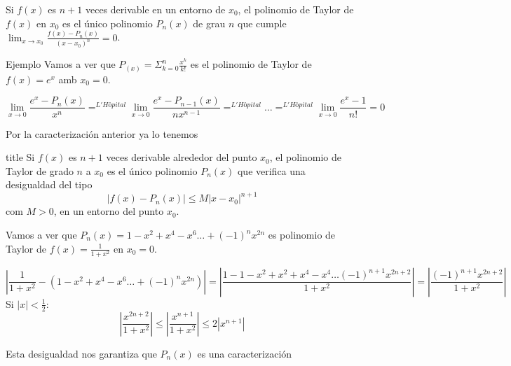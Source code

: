 \begin{frame}
    Si $f(x)$ es $n+1$ veces derivable en un entorno de $x_0$,
    el polinomio de Taylor de $f(x)$ en $x_0$ es el único
    polinomio $P_n(x)$ de grau $n$ que cumple
    \\
    $\lim_{x \rightarrow x_0} \frac{f(x)-P_n(x)}{(x-x_0)^n}=0$.
\end{frame}

\begin{frame}{Ejemplo}
Vamos a ver que $P_(x)= \Sigma^{n}_{k=0} \frac{x^k}{k!}$ es el polinomio
de Taylor de $f(x)=e^x$ amb $x_0=0$.

$$\lim_{x \rightarrow 0} \frac{e^x-P_n(x)}{x^n}=^{L'Hôpital}
\lim_{x \rightarrow 0} \frac{e^x-P_{n-1}(x)}{nx^{n-1}}=^{L'Hôpital} \dots =^{L'Hôpital}
\lim_{x \rightarrow 0} \frac{e^x-1}{n!}=0$$

Por la caracterización anterior ya lo tenemos

    
\end{frame}

\begin{frame}{title}
    Si $f(x)$ es $n+1$ veces derivable alrededor del punto $x_0$, el polinomio de Taylor de grado $n$ a $x_0$ es el único polinomio $P_n(x)$ que verifica una desigualdad del tipo
    \\
    $$|f(x)-P_n(x)| \leq M|x-x_0|^{n+1}$$
    com $M > 0$, en un entorno del punto $x_0$.
\end{frame}

\begin{frame}

    Vamos a ver que $P_n(x)= 1 - x^2 + x^4 - x^6 \dots + (-1)^nx^{2n}$ es polinomio de Taylor de
    $f(x)= \frac{1}{1+x^2}$ en $x_0=0$.

    $$|\frac{1}{1+x^2}-(1 - x^2 + x^4 - x^6 \dots + (-1)^nx^{2n})|
    =|\frac{1-1-x^2+x^2+x^4-x^4 \dots (-1)^{n+1}x^{2n+2}}{1+x^2}|=|\frac{(-1)^{n+1}x^{2n+2}}{1+x^2}|$$
    Si $|x|< \frac{1}{2}$:
    $$|\frac{x^{2n+2}}{1+x^2}|\leq |\frac{x^{n+1}}{1+x^2}| \leq 2|x^{n+1}| $$

    Esta desigualdad nos garantiza que $P_n(x)$
    es una caracterización
\end{frame}
